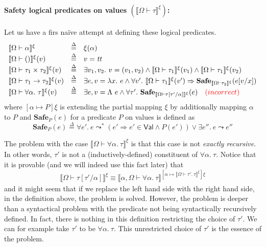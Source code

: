 \documentclass{article}
\newcommand{\TT}{\mathit{tt}}
\newcommand{\VAL}{\mathsf{Val}}
\newcommand{\UNT}{()}
\newcommand{\defeq}{\overset{\Delta}{=}}
\newcommand{\semtyp}[2]{\llbracket #2 \rrbracket_{#1}}
\begin{document}
\paragraph{Safety logical predicates on values $\left(\semtyp{}{\Omega \vdash \tau}^{\xi}\right)$:}
Let us have a firs na\"ive attempt at defining these logical
predicates.
\[
\begin{array}{lll}
\semtyp{}{\Omega \vdash \alpha}^{\xi} &\defeq& \xi(\alpha)\\
\semtyp{}{\Omega \vdash \UNT}^{\xi}(v) &\defeq& v = \TT\\
\semtyp{}{\Omega \vdash \tau_1 \times \tau_2}^{\xi}(v) &\defeq& \exists v_1, v_2.~v = (v_1, v_2) \land
\semtyp{}{\Omega \vdash \tau_1}^{\xi}(v_1) \land \semtyp{}{\Omega \vdash \tau_1}^{\xi}(v_2)\\
\semtyp{}{\Omega \vdash \tau_1 \to \tau_2}^{\xi}(v) &\defeq& \exists e, v = \lambda x.~e\land
\forall v'.~\semtyp{}{\Omega \vdash \tau_1}^{\xi}(v') \Rightarrow \mathbf{Safe}_{\semtyp{}{\Omega \vdash \tau_2}^{\xi}}(e[v/x])\\
\semtyp{}{\Omega \vdash \forall \alpha.~\tau}^{\xi}(v) &\defeq& \exists e, v = \Lambda~e\land
\forall \tau'.~\mathbf{Safe}_{\semtyp{}{\Omega \vdash \tau[\tau'/\alpha]}^{\xi}}(e) \hspace{1em} {\color{red}(incorrect)}
\end{array}
\]
where $[\alpha \mapsto P]\xi$ is extending the partial mapping $\xi$ by additionally mapping $\alpha$ to $P$ and $\mathbf{Safe}_{P}(e)$ for a predicate $P$ on values is defined as
\[
\mathbf{Safe}_{P}(e) \defeq \forall e'.~ e \leadsto^* (e'
\Rightarrow e' \in \VAL \land P(e')) \lor \exists e''.~e\leadsto e''
\]

The problem with the case $\semtyp{}{\Omega \vdash \forall \alpha.~\tau}^{\xi}$ is that this case is not \emph{exactly recursive}.
In other words, $\tau'$ is not a (inductively-defined)
constituent of $\forall \alpha.~\tau$.
Notice that it is provable (and we will indeed use this fact later)
that
\[
\semtyp{}{\Omega \vdash \tau[\tau'/\alpha]}^{\xi}
\equiv
\semtyp{}{\alpha, \Omega \vdash \forall \alpha.~\tau}^
{[\alpha \mapsto \semtyp{}{\Omega \vdash \tau'.~\tau}^{\xi}]\xi}
\]
and it might seem that if we replace the left hand side with
the right hand side, in the definition above, the problem is solved.
However, the problem is deeper than a syntactical problem with
the predicate not being syntactically recursively defined.
In fact, there is nothing in this definition restricting the choice of
$\tau'$. We can for example take $\tau'$ to be $\forall \alpha.~\tau$. This unrestricted choice of $\tau'$ is the essence of the problem.
\end{document}
